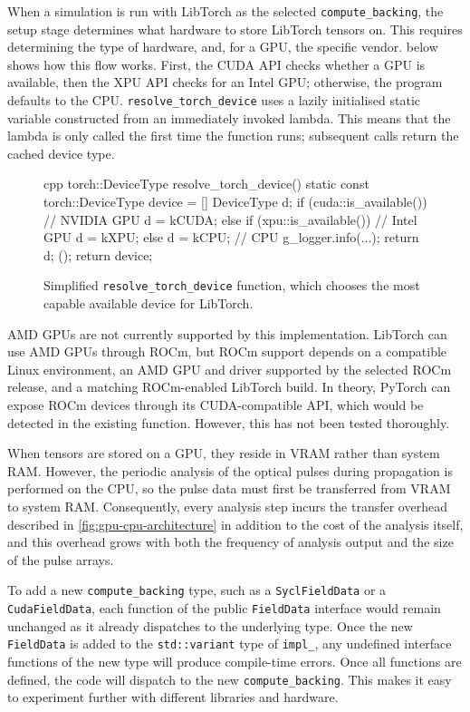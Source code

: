 When a simulation is run with LibTorch as the selected \texttt{compute\_backing}, the setup stage determines what hardware to store LibTorch tensors on.
This requires determining the type of hardware, and, for a GPU, the specific vendor.
 below shows how this flow works. 
First, the CUDA API checks whether a GPU is available, then the XPU API checks for an Intel GPU; otherwise, the program defaults to the CPU.
\texttt{resolve\_torch\_device} uses a lazily initialised static variable constructed from an immediately invoked lambda.
This means that the lambda is only called the first time the function runs; subsequent calls return the cached device type.

\begin{figure}
\begin{code}{cpp}
torch::DeviceType resolve_torch_device() {
    static const torch::DeviceType device = [] {
        DeviceType d;
        if (cuda::is_available()) { // NVIDIA GPU
            d = kCUDA;
        } else if (xpu::is_available()) { // Intel GPU
            d = kXPU;
        } else {
            d = kCPU; // CPU
        }
        g_logger.info(...);
        return d;
    }();
    return device;
}
\end{code}
  \caption{Simplified \texttt{resolve\_torch\_device} function, which chooses the most capable available device for LibTorch.}
  \label{fig:hardware-detection}
\end{figure}

AMD GPUs are not currently supported by this implementation. 
LibTorch can use AMD GPUs through ROCm, but ROCm support depends on a compatible Linux
environment, an AMD GPU and driver supported by the selected ROCm release, and a matching
ROCm-enabled LibTorch build. In theory, PyTorch can expose ROCm devices through its
CUDA-compatible API, which would be detected in the existing function. However, this has not
been tested thoroughly.


When tensors are stored on a GPU, they reside in VRAM rather than system RAM. 
However, the periodic analysis of the optical pulses during propagation is performed on the CPU, 
so the pulse data must first be transferred from VRAM to system RAM. Consequently, every analysis step incurs the 
transfer overhead described in \cref{fig:gpu-cpu-architecture} in addition to the cost of the analysis itself, 
and this overhead grows with both the frequency of analysis output and the size of the pulse arrays.

To add a new \texttt{compute\_backing} type, such as a \texttt{SyclFieldData} or a \texttt{CudaFieldData},
each function of the public \texttt{FieldData} interface would remain unchanged as it already dispatches to the underlying type.
Once the new \texttt{FieldData} is added to the \texttt{std::variant} type of \texttt{impl\_}, any undefined interface functions of the new type will produce compile-time errors.
Once all functions are defined, the code will dispatch to the new \texttt{compute\_backing}.
This makes it easy to experiment further with different libraries and hardware.

